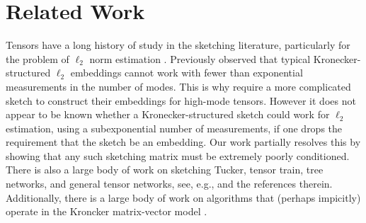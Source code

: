\section{Related Work}
Tensors have a long history of study in the sketching literature, particularly for the problem of $\ell_2$ norm estimation \cite{ahle2020oblivious, ahle2019almost, pham2013fast}.
Previously \cite{ahle2019almost} observed that typical Kronecker-structured $\ell_2$ embeddings cannot work with fewer than exponential measurements in the number of modes.
This is why \cite{ahle2019almost} require a more complicated sketch to construct their embeddings for high-mode tensors.
However it does not appear to be known whether a  Kronecker-structured sketch could work for $\ell_2$ estimation, using a subexponential number of measurements, if one drops the requirement that the sketch be an embedding.
Our work partially resolves this by showing that any such sketching matrix must be extremely poorly conditioned.
There is also a large body of work on sketching Tucker, tensor train, tree networks, and general tensor networks, see, e.g., \cite{grasedyck2013literature,SWZ19,MWZ24} and the references therein.
Additionally, there is a large body of work on algorithms that (perhaps impicitly) operate in the Kroncker matrix-vector model \cite{bujanovic2021norm,bujanovic2024subspace,feldman2022entanglement,ahle2019almost,meyer2023hutchinson,avron2014subspace}.